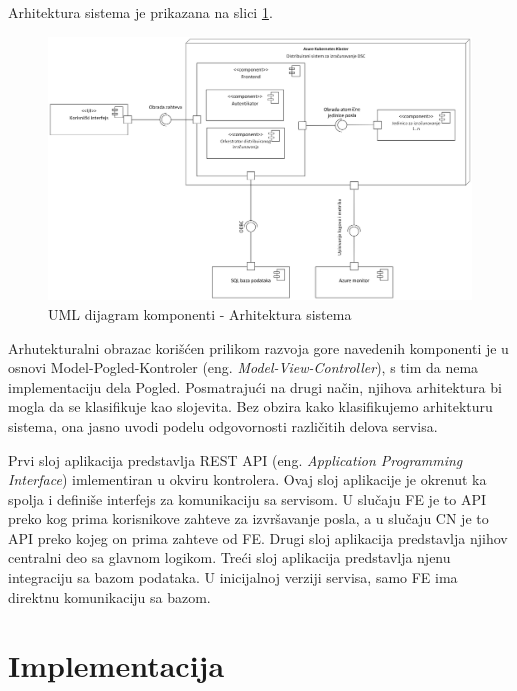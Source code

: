 \documentclass[12pt,oneside]{memoir}
\begin{document}
Arhitektura sistema je prikazana na slici \ref{fig:arhitektura}.

\begin{figure}[!ht]
  \centering
  \includegraphics[width=1.0\textwidth]{./images/arhitektura_sistema_dijagram_komponenti.png}
  \caption{UML dijagram komponenti - Arhitektura sistema}
  \label{fig:arhitektura}
\end{figure}

Arhutekturalni obrazac korišćen prilikom razvoja gore navedenih komponenti je u osnovi Model-Pogled-Kontroler (eng. \emph{Model-View-Controller}), s tim da nema implementaciju dela Pogled. Posmatrajući na drugi način, njihova arhitektura bi mogla da se klasifikuje kao slojevita. Bez obzira kako klasifikujemo arhitekturu sistema, ona jasno uvodi podelu odgovornosti različitih delova servisa.

Prvi sloj aplikacija predstavlja REST API (eng. \emph{Application Programming Interface}) imlementiran u okviru kontrolera. Ovaj sloj aplikacije je okrenut ka spolja i definiše interfejs za komunikaciju sa servisom. U slučaju FE je to API preko kog prima korisnikove zahteve za izvršavanje posla, a u slučaju CN je to API preko kojeg on prima zahteve od FE. Drugi sloj aplikacija predstavlja njihov centralni deo sa glavnom logikom. Treći sloj aplikacija predstavlja njenu integraciju sa bazom podataka. U inicijalnoj verziji servisa, samo FE ima direktnu komunikaciju sa bazom.


\section{Implementacija}
\end{document}
